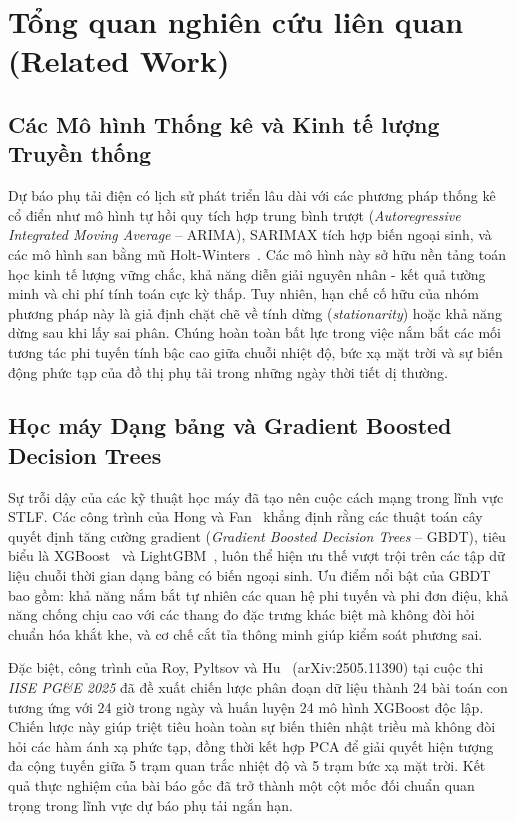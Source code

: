 \section{Tổng quan nghiên cứu liên quan (Related Work)}
\label{sec:related_work}

\subsection{Các Mô hình Thống kê và Kinh tế lượng Truyền thống}
Dự báo phụ tải điện có lịch sử phát triển lâu dài với các phương pháp thống kê cổ điển như mô hình tự hồi quy tích hợp trung bình trượt (\textit{Autoregressive Integrated Moving Average} -- ARIMA), SARIMAX tích hợp biến ngoại sinh, và các mô hình san bằng mũ Holt-Winters~\cite{hyndman2018forecasting}. Các mô hình này sở hữu nền tảng toán học kinh tế lượng vững chắc, khả năng diễn giải nguyên nhân - kết quả tường minh và chi phí tính toán cực kỳ thấp. Tuy nhiên, hạn chế cố hữu của nhóm phương pháp này là giả định chặt chẽ về tính dừng (\textit{stationarity}) hoặc khả năng dừng sau khi lấy sai phân. Chúng hoàn toàn bất lực trong việc nắm bắt các mối tương tác phi tuyến tính bậc cao giữa chuỗi nhiệt độ, bức xạ mặt trời và sự biến động phức tạp của đồ thị phụ tải trong những ngày thời tiết dị thường.

\subsection{Học máy Dạng bảng và Gradient Boosted Decision Trees}
Sự trỗi dậy của các kỹ thuật học máy đã tạo nên cuộc cách mạng trong lĩnh vực STLF. Các công trình của Hong và Fan~\cite{hong2016probabilistic} khẳng định rằng các thuật toán cây quyết định tăng cường gradient (\textit{Gradient Boosted Decision Trees} -- GBDT), tiêu biểu là XGBoost~\cite{chen2016xgboost} và LightGBM~\cite{ke2017lightgbm}, luôn thể hiện ưu thế vượt trội trên các tập dữ liệu chuỗi thời gian dạng bảng có biến ngoại sinh. Ưu điểm nổi bật của GBDT bao gồm: khả năng nắm bắt tự nhiên các quan hệ phi tuyến và phi đơn điệu, khả năng chống chịu cao với các thang đo đặc trưng khác biệt mà không đòi hỏi chuẩn hóa khắt khe, và cơ chế cắt tỉa thông minh giúp kiểm soát phương sai.

Đặc biệt, công trình của Roy, Pyltsov và Hu~\cite{roy2025hourly} (arXiv:2505.11390) tại cuộc thi \textit{IISE PG\&E 2025} đã đề xuất chiến lược phân đoạn dữ liệu thành 24 bài toán con tương ứng với 24 giờ trong ngày và huấn luyện 24 mô hình XGBoost độc lập. Chiến lược này giúp triệt tiêu hoàn toàn sự biến thiên nhật triều mà không đòi hỏi các hàm ánh xạ phức tạp, đồng thời kết hợp PCA để giải quyết hiện tượng đa cộng tuyến giữa 5 trạm quan trắc nhiệt độ và 5 trạm bức xạ mặt trời. Kết quả thực nghiệm của bài báo gốc đã trở thành một cột mốc đối chuẩn quan trọng trong lĩnh vực dự báo phụ tải ngắn hạn.

